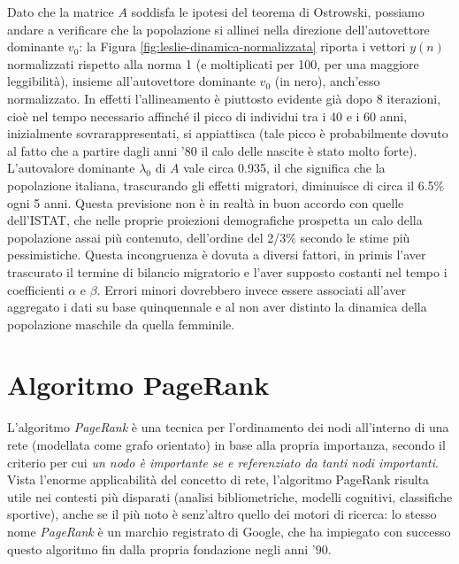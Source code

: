 Dato che la matrice $A$ soddisfa le ipotesi del teorema di Ostrowski,
possiamo andare a verificare che la popolazione si allinei
nella direzione dell'autovettore dominante $v_0$:
la Figura \ref{fig:leslie-dinamica-normalizzata} riporta i vettori
$y(n)$ normalizzati rispetto alla norma 1 (e moltiplicati per 100,
per una maggiore leggibilità), insieme all'autovettore dominante $v_0$ (in nero),
anch'esso normalizzato. In effetti l'allineamento è piuttosto evidente già
dopo 8 iterazioni, cioè nel tempo necessario affinché il picco di individui
tra i 40 e i 60 anni, inizialmente sovrarappresentati, si appiattisca
(tale picco è probabilmente dovuto al fatto che a partire dagli
anni '80 il calo delle nascite è stato molto forte).
L'autovalore dominante $\lambda_0$ di $A$ vale circa 0.935, il che
significa che la popolazione italiana, trascurando gli effetti migratori,
diminuisce di circa il 6.5\% ogni 5 anni.
Questa previsione non è in realtà in buon accordo con quelle dell'ISTAT,
che nelle proprie proiezioni demografiche prospetta un calo della
popolazione assai più contenuto, dell'ordine del 2/3\% secondo
le stime più pessimistiche.
Questa incongruenza è dovuta a diversi fattori, in primis
l'aver trascurato il termine di bilancio migratorio e
l'aver supposto costanti nel tempo i coefficienti $\alpha$ e $\beta$.
Errori minori dovrebbero invece essere associati all'aver aggregato
i dati su base quinquennale e al non aver distinto la dinamica della
popolazione maschile da quella femminile.

\section{Algoritmo PageRank}

L'algoritmo \emph{PageRank} è una tecnica per l'ordinamento dei nodi
all'interno di una rete (modellata come grafo orientato) in base
alla propria importanza, secondo il criterio per cui
\emph{un nodo è importante se e referenziato da tanti nodi importanti}.
Vista l'enorme applicabilità del concetto di rete, l'algoritmo PageRank
risulta utile nei contesti più disparati (analisi bibliometriche, modelli
cognitivi, classifiche sportive), anche se il più noto è senz'altro quello
dei motori di ricerca: lo stesso nome \emph{PageRank} è un marchio registrato
di Google, che ha impiegato con successo questo algoritmo fin dalla propria
fondazione negli anni '90.

